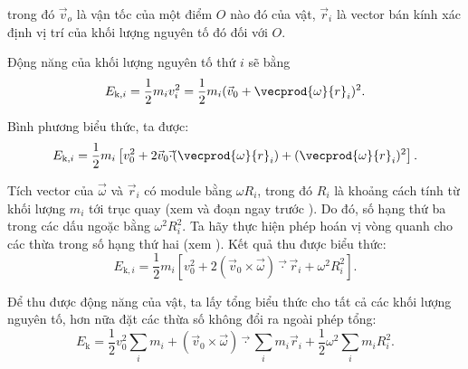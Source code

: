 \noindent
trong đó $\vec{v}_o$ là vận tốc của một điểm $O$ nào đó của vật, $\vec{r}_i$ là vector bán kính xác định vị trí của khối lượng nguyên tố đó đối với $O$.

Động năng của khối lượng nguyên tố thứ $i$ sẽ bằng
\begin{equation*}
	E_{\text{k},i} = \frac{1}{2}m_i v_i^2 = \frac{1}{2}m_i (\vec{v}_0 + \vecprod{\omega}{r}_i)^2.
\end{equation*}

\noindent
Bình phương biểu thức, ta được:
\begin{equation*}
	E_{\text{k},i} = \frac{1}{2}m_i \left[v_0^2 + 2\vec{v}_0\vec{\cdot}(\vecprod{\omega}{r}_i) + (\vecprod{\omega}{r}_i)^2\right].
\end{equation*}

\noindent
Tích vector của $\vec{\omega}$ và $\vec{r}_i$ có module bằng $\omega R_i$, trong đó $R_i$ là khoảng cách tính từ khối lượng $m_i$ tới trục quay (xem  và đoạn ngay trước ). Do đó, số hạng thứ ba trong các dấu ngoặc bằng $\omega^2R_i^2$. Ta hãy thực hiện phép hoán vị vòng quanh cho các thừa trong số hạng thứ hai (xem ). Kết quả thu được biểu thức:
\begin{equation}\label{eq:5_53}
	E_{\text{k},i} = \frac{1}{2}m_i \left[v_0^2 + 2(\vec{v}_0\times\vec{\omega})\vec{\cdot}\vec{r}_i + \omega^2 R_i^2\right].
\end{equation}

Để thu được động năng của vật, ta lấy tổng biểu thức  cho tất cả các khối lượng nguyên tố, hơn nữa đặt các thừa số không đổi ra ngoài phép tổng:
\begin{equation*}
	E_{\text{k}} = \frac{1}{2} v_0^2 \sum_i m_i + (\vec{v}_0\times\vec{\omega})\vec{\cdot}\sum_i m_i\vec{r}_i + \frac{1}{2}\omega^2 \sum_i m_iR_i^2.
\end{equation*}

